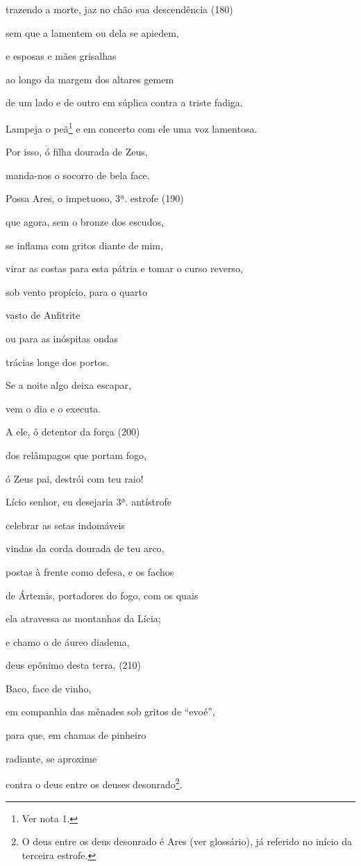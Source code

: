 trazendo a morte, jaz no chão sua descendência (180)

sem que a lamentem ou dela se apiedem,

e esposas e mães grisalhas

ao longo da margem dos altares gemem

de um lado e de outro em súplica contra a triste fadiga.

Lampeja o peã\footnote{Ver nota 1.} e em concerto com ele uma voz
lamentosa.

Por isso, ó filha dourada de Zeus,

manda-nos o socorro de bela face.

Possa Ares, o impetuoso, 3ª. estrofe (190)

que agora, sem o bronze dos escudos,

se inflama com gritos diante de mim,

virar as costas para esta pátria e tomar o curso reverso,

sob vento propício, para o quarto

vasto de Anfitrite

ou para as inóspitas ondas

trácias longe dos portos.

Se a noite algo deixa escapar,

vem o dia e o executa.

A ele, ó detentor da força (200)

dos relâmpagos que portam fogo,

ó Zeus pai, destrói com teu raio!

Lício senhor, eu desejaria 3ª. antístrofe

celebrar as setas indomáveis

vindas da corda dourada de teu arco,

postas à frente como defesa, e os fachos

de Ártemis, portadores do fogo, com os quais

ela atravessa as montanhas da Lícia;

e chamo o de áureo diadema,

deus epônimo desta terra, (210)

Baco, face de vinho,

em companhia das mênades sob gritos de ``evoé'',

para que, em chamas de pinheiro

radiante, se aproxime

contra o deus entre os deuses desonrado\footnote{O deus entre os deus
  desonrado é Ares (ver glossário), já referido no início da terceira
  estrofe.}.

